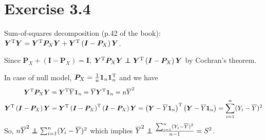 \section*{Exercise 3.4}
Sum-of-squares decomposition (p.42 of the book): $\bm{Y}^{\rm T}\bm{Y} = \bm{Y}^{\rm T}\bm{P}_{X}\bm{Y} + \bm{Y}^{\rm T}\left(\bm{I} - \bm{P}_{X} \right)\bm{Y}$.

Since $\bm{P}_{X} + (\bm{I} -\bm{P}_{X}) = \bm{I}$, $\bm{Y}^{\rm T}\bm{P}_{X}\bm{Y} \independent \bm{Y}^{\rm T}\left(\bm{I} - \bm{P}_{X}\right)\bm{Y}$ by Cochran's theorem.

In case of null model, $\bm{P}_{X} = \frac{1}{n}\bm{1}_{n}\bm{1}_{n}^{\rm T}$ and we have
\begin{align*}
\bm{Y}^{\rm T}\bm{P}_{X}\bm{Y} &= \bm{Y}^{\rm T}\overline{Y}\bm{1}_{n} = \overline{Y}\bm{Y}^{\rm T}\bm{1}_{n} = n\overline{Y}^2\\
\bm{Y}^{\rm T}\left(\bm{I} - \bm{P}_{X}\right)\bm{Y} &= \bm{Y}^{\rm T}\left(\bm{I} - \bm{P}_{X}\right)^{\rm T}\left(\bm{I} - \bm{P}_{X}\right)\bm{Y} = \left(\bm{Y} - \overline{Y}\bm{1}_{n}\right)^{\rm T}\left(\bm{Y} - \overline{Y}\bm{1}_{n}\right) = \sum_{i=1}^{n} (Y_{i} - \overline{Y})^{2}
\end{align*}
So, $n\overline{Y}^2 \independent \sum_{i=1}^{n} (Y_{i} - \overline{Y})^{2}$ which implies  $\overline{Y}^2 \independent \frac{\sum_{i=1}^{n} (Y_{i} - \overline{Y})^{2}}{n-1} = S^2$.